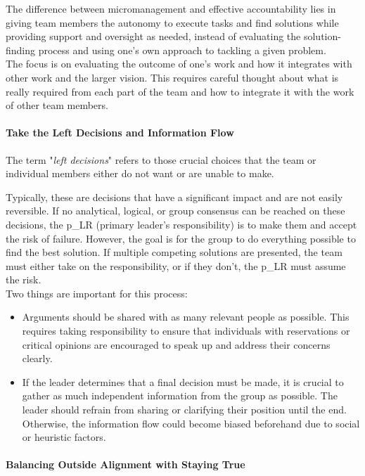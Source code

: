 The difference between micromanagement and effective accountability lies in giving team members the autonomy to execute tasks and find solutions while providing support and oversight as needed, instead of evaluating the solution-finding process and using one's own approach to tackling a given problem.\\

The focus is on evaluating the outcome of one's work and how it integrates with other work and the larger vision. This requires careful thought about what is really required from each part of the team and how to integrate it with the work of other team members.

\paragraph{Take the Left Decisions and Information Flow}
The term "\textit{left decisions}" refers to those crucial choices that the team or individual members either do not want or are unable to make.

Typically, these are decisions that have a significant impact and are not easily reversible. If no analytical, logical, or group consensus can be reached on these decisions, the \gls{p_LR} (primary leader's responsibility) is to make them and accept the risk of failure. However, the goal is for the group to do everything possible to find the best solution. If multiple competing solutions are presented, the team must either take on the responsibility, or if they don't, the \gls{p_LR} must assume the risk.\\

Two things are important for this process:
\begin{itemize}
	\item Arguments should be shared with as many relevant people as possible. This requires taking responsibility to ensure that individuals with reservations or critical opinions are encouraged to speak up and address their concerns clearly.
	\item If the leader determines that a final decision must be made, it is crucial to gather as much independent information from the group as possible. The leader should refrain from sharing or clarifying their position until the end. Otherwise, the information flow could become biased beforehand due to social or heuristic factors.
\end{itemize}

\paragraph{Balancing Outside Alignment with Staying True}

